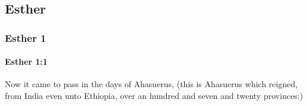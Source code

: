 \subsection{Esther}
	\label{ESTHER}

	\subsubsection{Esther 1} %
		\label{ESTHER-1}

		\paragraph{Esther 1:1} %
			\label{ESTHER-1-1}

			Now it came to pass in the days of Ahasuerus, (this is Ahasuerus which reigned, from India even unto Ethiopia, over an hundred and seven and twenty provinces:)

